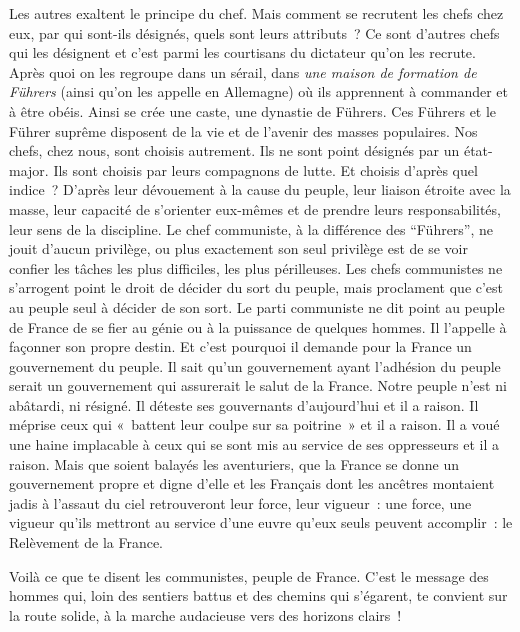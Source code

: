 \documentclass[french,twoside]{book} %
\newcommand{\dateline}[1]{\medskip{\RaggedLeft{#1}\par}\bigskip}
\begin{document}
Les autres exaltent le principe du chef. Mais comment se recrutent les chefs chez eux, par qui sont-ils désignés, quels sont leurs attributs ? Ce sont d’autres chefs qui les désignent et c’est parmi les courtisans du dictateur qu’on les recrute. Après quoi on les regroupe dans un sérail, dans \emph{une maison de formation de Führers} (ainsi qu’on les appelle en Allemagne) où ils apprennent à commander et à être obéis. Ainsi se crée une caste, une dynastie de Führers. Ces Führers et le Führer suprême disposent de la vie et de l’avenir des masses populaires. Nos chefs, chez nous, sont choisis autrement. Ils ne sont point désignés par un état-major. Ils sont choisis par leurs compagnons de lutte. Et choisis d’après quel indice ? D’après leur dévouement à la cause du peuple, leur liaison étroite avec la masse, leur capacité de s’orienter eux-mêmes et de prendre leurs responsabilités, leur sens de la discipline. Le chef communiste, à la différence des “Führers”, ne jouit d’aucun privilège, ou plus exactement son seul privilège est de se voir confier les tâches les plus difficiles, les plus périlleuses. Les chefs communistes ne s’arrogent point le droit de décider du sort du peuple, mais proclament que c’est au peuple seul à décider de son sort. Le parti communiste ne dit point au peuple de France de se fier au génie ou à la puissance de quelques hommes. Il l’appelle à façonner son propre destin. Et c’est pourquoi il demande pour la France un gouvernement du peuple. Il sait qu’un gouvernement ayant l’adhésion du peuple serait un gouvernement qui assurerait le salut de la France. Notre peuple n’est ni abâtardi, ni résigné. Il déteste ses gouvernants d’aujourd’hui et il a raison. Il méprise ceux qui « battent leur coulpe sur sa poitrine » et il a raison. Il a voué une haine implacable à ceux qui se sont mis au service de ses oppresseurs et il a raison. Mais que soient balayés les aventuriers, que la France se donne un gouvernement propre et digne d’elle et les Français dont les ancêtres montaient jadis à l’assaut du ciel retrouveront leur force, leur vigueur : une force, une vigueur qu’ils mettront au service d’une euvre qu’eux seuls peuvent accomplir : le Relèvement de la France.\par
Voilà ce que te disent les communistes, peuple de France. C’est le message des hommes qui, loin des sentiers battus et des chemins qui s’égarent, te convient sur la route solide, à la marche audacieuse vers des horizons clairs !\par

\dateline{Fin avril 1941, Paris.}
 
\end{document}

